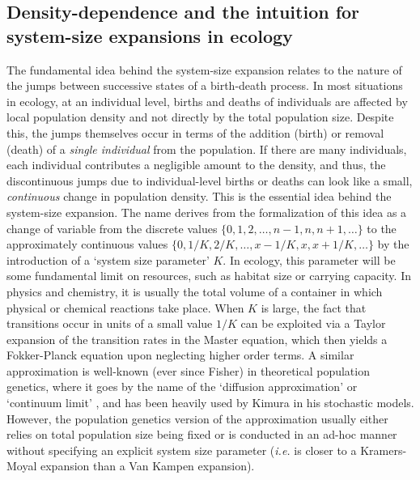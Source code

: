 \subsection{Density-dependence and the intuition for system-size expansions in ecology}
The fundamental idea behind the system-size expansion relates to the nature of the jumps between successive states of a birth-death process. In most situations in ecology, at an individual level, births and deaths of individuals are affected by local population density and not directly by the total population size. Despite this, the jumps themselves occur in terms of the addition (birth) or removal (death) of a \emph{single individual} from the population. If there are many individuals, each individual contributes a negligible amount to the density, and thus, the discontinuous jumps due to individual-level births or deaths can look like a small, \emph{continuous} change in population density. This is the essential idea behind the system-size expansion. The name derives from the formalization of this idea as a change of variable from the discrete values $\{0,1,2,\ldots,n-1,n,n+1,\ldots\}$ to the approximately continuous values $\{0,1/K,2/K,\dots,x-1/K,x,x+1/K,\ldots\}$ by the introduction of a `system size parameter' $K$. In ecology, this parameter will be some fundamental limit on resources, such as habitat size or carrying capacity. In physics and chemistry, it is usually the total volume of a container in which physical or chemical reactions take place. When $K$ is large, the fact that transitions occur in units of a small value $1/K$ can be exploited via a Taylor expansion of the transition rates in the Master equation, which then yields a Fokker-Planck equation upon neglecting higher order terms. A similar approximation is well-known (ever since Fisher) in theoretical population genetics, where it goes by the name of the `diffusion approximation'\citep{ewens_mathematical_2004} or `continuum limit' \citep{czuppon_understanding_2021}, and has been heavily used by Kimura \citep{crow_introduction_1970} in his stochastic models. However, the population genetics version of the approximation usually either relies on total population size being fixed \citep{crow_introduction_1970, lande_natural_1976,ewens_mathematical_2004} or is conducted in an ad-hoc manner without specifying an explicit system size parameter (\emph{i.e.} is closer to a Kramers-Moyal expansion than a Van Kampen expansion).


